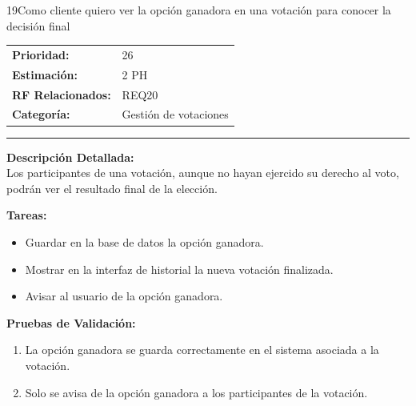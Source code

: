 \begin{hu_card}{19}{Como cliente quiero ver la opción ganadora en una votación para conocer la decisión final}
    \begin{tabularx}{\linewidth}{l X}
        \textbf{Prioridad:}   & 26\\
        \textbf{Estimación:}  & 2 PH \\
        \textbf{RF Relacionados:} & REQ20 \\
        \textbf{Categoría:} & Gestión de votaciones \\
    \end{tabularx}

    \vspace{2mm}
    \hrule
    \vspace{2mm}

    \textbf{Descripción Detallada:} \\
    Los participantes de una votación, aunque no hayan ejercido su derecho al voto, podrán ver el resultado final de la elección.

    \vspace{2mm}
    \textbf{Tareas:}
    \begin{itemize}[noitemsep, topsep=0pt]
        \item Guardar en la base de datos la opción ganadora.
        \item Mostrar en la interfaz de historial la nueva votación finalizada.
        \item Avisar al usuario de la opción ganadora.
    \end{itemize}

    \vspace{2mm}
    \textbf{Pruebas de Validación:}
    \begin{enumerate}[noitemsep, topsep=0pt]
        \item La opción ganadora se guarda correctamente en el sistema asociada a la votación.
        \item Solo se avisa de la opción ganadora a los participantes de la votación.
    \end{enumerate}
\end{hu_card}

